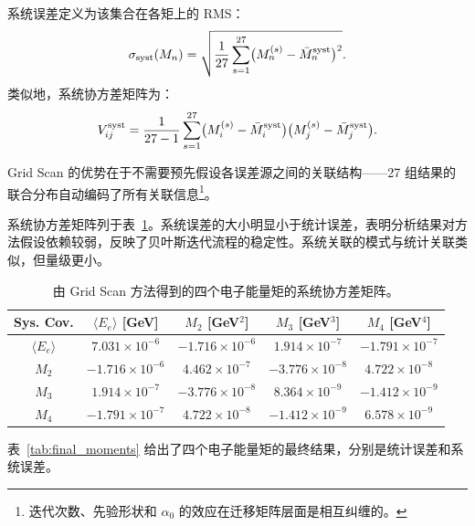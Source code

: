 系统误差定义为该集合在各矩上的 RMS：
\begin{equation}
    \sigma_{\rm syst}(M_n) = \sqrt{ \frac{1}{27} \sum_{s=1}^{27} \bigl(M_n^{(s)} - \bar{M}_n^{\rm syst}\bigr)^2 } .
\end{equation}
类似地，系统协方差矩阵为：
\begin{equation}
    V_{ij}^{\rm syst} = \frac{1}{27-1} \sum_{s=1}^{27} \bigl(M_i^{(s)} - \bar{M}_i^{\rm syst}\bigr) \bigl(M_j^{(s)} - \bar{M}_j^{\rm syst}\bigr) .
\end{equation}

Grid Scan 的优势在于不需要预先假设各误差源之间的关联结构——27 组结果的联合分布自动编码了所有关联信息\footnote{迭代次数、先验形状和 $\alpha_0$ 的效应在迁移矩阵层面是相互纠缠的。}。

系统协方差矩阵列于表~\ref{tab:syst_cov}。系统误差的大小明显小于统计误差，表明分析结果对方法假设依赖较弱，反映了贝叶斯迭代流程的稳定性。系统关联的模式与统计关联类似，但量级更小。

\begin{table}[htbp]
    \centering
    \caption{由 Grid Scan 方法得到的四个电子能量矩的系统协方差矩阵。}
    \label{tab:syst_cov}
    \begin{tabular}{c cccc}
        \toprule
        Sys. Cov. & $\langle E_e\rangle$ [GeV] & $M_2$ [GeV$^2$] & $M_3$ [GeV$^3$] & $M_4$ [GeV$^4$] \\
        \midrule
        $\langle E_e\rangle$ & $7.031\times10^{-6}$ & $-1.716\times10^{-6}$ & $1.914\times10^{-7}$ & $-1.791\times10^{-7}$ \\
        $M_2$ & $-1.716\times10^{-6}$ & $4.462\times10^{-7}$ & $-3.776\times10^{-8}$ & $4.722\times10^{-8}$ \\
        $M_3$ & $1.914\times10^{-7}$ & $-3.776\times10^{-8}$ & $8.364\times10^{-9}$ & $-1.412\times10^{-9}$ \\
        $M_4$ & $-1.791\times10^{-7}$ & $4.722\times10^{-8}$ & $-1.412\times10^{-9}$ & $6.578\times10^{-9}$ \\
        \bottomrule
    \end{tabular}
\end{table}

表~\ref{tab:final_moments} 给出了四个电子能量矩的最终结果，分别是统计误差和系统误差。

